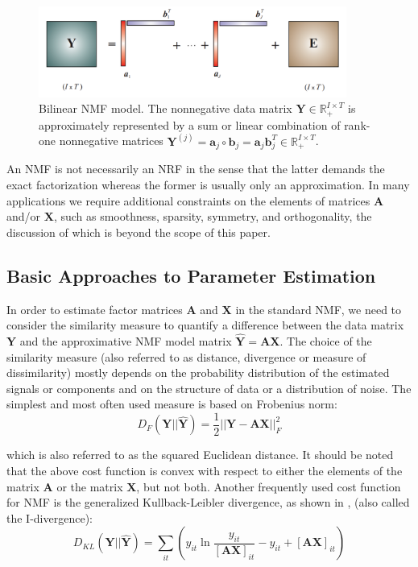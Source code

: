 \documentclass[11pt]{article}
\begin{document}
\FloatBarrier
\begin{figure}[!htbp]
\centering
\includegraphics[width=0.9\textwidth]{bilinear}
\caption{Bilinear NMF model. The nonnegative data matrix $\mathbf{Y} \in \mathbb{R}^{I \times T}_{+}$ is approximately represented by a sum or linear combination of rank-one nonnegative matrices $\mathbf{Y}^{(j)} = \mathbf{a}_j \circ \mathbf{b}_j = \mathbf{a}_j \mathbf{b}_j^T \in \mathbb{R}^{I \times T}_{+}$.} 
\label{fig1}
\end{figure}
\FloatBarrier


An NMF is not necessarily an NRF in the sense that the latter demands the exact factorization whereas the former is usually only an approximation. In many applications we require additional constraints on the elements of matrices $\mathbf{A}$ and/or $\mathbf{X}$, such as smoothness, sparsity, symmetry, and
orthogonality, the discussion of which is beyond the scope of this paper.

\subsection{Basic Approaches to Parameter Estimation}

In order to estimate factor matrices $\mathbf{A}$ and $\mathbf{X}$ in the standard NMF, we need to consider the similarity measure to quantify a difference between the data matrix $\mathbf{Y}$ and the approximative NMF model matrix $\hat{\mathbf{Y}} = \mathbf{AX}$. The choice of the similarity measure (also referred to as distance, divergence or measure of dissimilarity) mostly depends on the probability distribution of the estimated signals or components and on the structure of data or a distribution of noise. The
simplest and most often used measure is based on Frobenius norm:
$$D_F(\mathbf{Y}||\hat{\mathbf{Y}}) = \frac{1}{2}||\mathbf{Y-AX}||_F^2$$

which is also referred to as the squared Euclidean distance. It should be noted that the above cost function is convex with respect to either the elements of the matrix $\mathbf{A}$ or the matrix $\mathbf{X}$, but not both. Another frequently used cost function for NMF is the generalized Kullback-Leibler divergence, as shown in \cite{94}, (also called the I-divergence):
$$D_{KL}(\mathbf{Y}||\hat{\mathbf{Y}}) = \sum_{it} \left( y_{it} \ln \frac{y_{it}}{[\mathbf{AX}]_{it}} - y_{it} + [\mathbf{AX}]_{it} \right)$$
\end{document}
